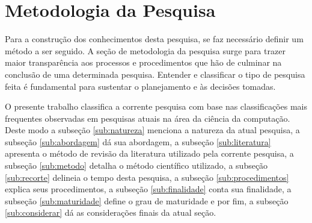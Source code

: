  

 


\section{Metodologia da Pesquisa}\label{sec:metodologia}

Para a construção dos conhecimentos desta pesquisa, se faz necessário definir um método a ser seguido. A seção de metodologia da pesquisa surge para trazer maior transparência aos processos e procedimentos que hão de culminar na conclusão de uma determinada pesquisa. Entender e classificar o tipo de pesquisa feita é fundamental para sustentar o planejamento e às decisões tomadas.








O presente trabalho classifica a corrente pesquisa com base nas classificações mais frequentes observadas em pesquisas atuais na área da ciência da computação. Deste modo a subseção \ref{sub:natureza} menciona a natureza da atual pesquisa, a subseção \ref{sub:abordagem} dá sua abordagem, a subseção \ref{sub:literatura} apresenta o método de revisão da literatura utilizado pela corrente pesquisa, a subseção \ref{sub:metodo} detalha o método científico utilizado, a subseção \ref{sub:recorte} delineia o tempo desta pesquisa, a subseção \ref{sub:procedimentos} explica seus procedimentos, a subseção \ref{sub:finalidade} conta sua finalidade, a subseção \ref{sub:maturidade} define o grau de maturidade e por fim, a subseção \ref{sub:considerar} dá as considerações finais da atual seção. 

